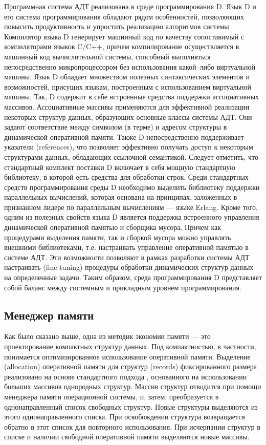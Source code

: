 Программная система АДТ реализована в среде программирования D. Язык D и его система программирования обладают рядом особенностей, позволяющих повысить продуктивность и упростить реализацию алгоритмов системы. Компилятор языка D генерирует машинный код по качеству сопоставимый с компиляторами языков C/C++, причем компилирование осуществляется в машинный код вычислительной системы, способный выполняться непосредственно микропроцессором без использования какой--либо виртуальной машины. Язык D обладает множеством полезных синтаксических элементов и возможностей, присущих языкам, построенным с использованием виртуальной машины. Так, D содержит в себе встроенные средства поддержки ассоциативных массивов. Ассоциативные массивы применяются для эффективной реализации некоторых структур данных, образующих основные классы системы АДТ. Они задают соответствие между символом (в терме) и адресом структуры в динамической оперативной памяти. Также D непосредственно поддерживает указатели (references), что позволяет эффективно получать доступ к некоторым структурами данных, обладающих ссылочной семантикой. Следует отметить, что стандартный комплект поставки D включает в себя мощную стандартную библиотеку, в которой есть средства для обработки строк. Среди стандартных средств программирования среды D необходимо выделить библиотеку поддержки параллельных вычислений, которая основана на принципах, заложенных в признанном лидере по параллельным вычислениям --- языке Erlang. Кроме того, одним из полезных свойств языка D является поддержка встроенного управления динамической оперативной памятью и сборщика мусора. Причем как процедурами выделения памяти, так и сборкой мусора можно управлять внешними библиотеками, т.е. настраивать управление оперативной памятью в системе АДТ. Эти возможности позволяют в рамках разработки системы АДТ настраивать (fine tuning) процедуры обработки динамических структур данных на определенные задачи. Таким образом, среда программирования D представляет собой баланс между системным и прикладным уровнем программирования.


\subsection{Менеджер памяти}

Как было сказано выше, одна из методик экономии памяти --- это проектирование компактных структур данных. Под компактностью, в частности, понимается оптимизированное использование оперативной памяти. Выделение (allocation) оперативной памяти для структур (records) фиксированного размера реализовано на основе стандартного подхода \cite{}, основанного на использовании больших массивов однородных структур. Массив структур отводится при помощи менеджера памяти операционной системы, и, затем, преобразуется в однонаправленный список свободных структур. Новые структуры выделяются из этого однонаправленного списка. При освобождении структура возвращается обратно в этот список для повторного использования. При исчерпании структур в списке и наличии свободной оперативной памяти выделяются новые массивы.

